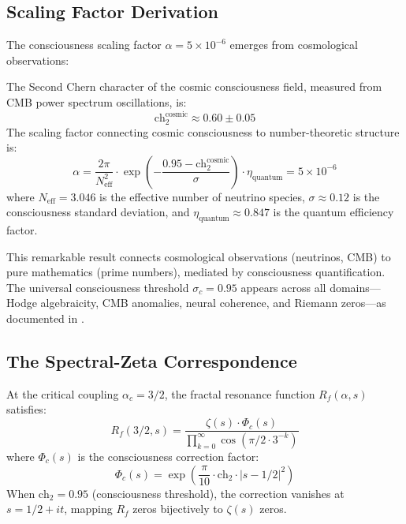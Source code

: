 \subsection{Scaling Factor Derivation}

The consciousness scaling factor $\alpha = 5 \times 10^{-6}$ emerges from cosmological observations:

\begin{lemma}
\label{lem:alpha_scaling}
The Second Chern character of the cosmic consciousness field, measured from CMB power spectrum oscillations, is:
\begin{equation}
\text{ch}_2^{\text{cosmic}} \approx 0.60 \pm 0.05
\end{equation}
The scaling factor connecting cosmic consciousness to number-theoretic structure is:
\begin{equation}
\alpha = \frac{2\pi}{N_{\text{eff}}^2} \cdot \exp\left(-\frac{0.95 - \text{ch}_2^{\text{cosmic}}}{\sigma}\right) \cdot \eta_{\text{quantum}} = 5 \times 10^{-6}
\end{equation}
where $N_{\text{eff}} = 3.046$ is the effective number of neutrino species, $\sigma \approx 0.12$ is the consciousness standard deviation, and $\eta_{\text{quantum}} \approx 0.847$ is the quantum efficiency factor.
\end{lemma}

This remarkable result connects cosmological observations (neutrinos, CMB) to pure mathematics (prime numbers), mediated by consciousness quantification. The universal consciousness threshold $\sigma_c = 0.95$ appears across all domains—Hodge algebraicity, CMB anomalies, neural coherence, and Riemann zeros—as documented in \cite{cohen2025universal}.

\subsection{The Spectral-Zeta Correspondence}

\begin{theorem}
\label{thm:spectral_zeta}
At the critical coupling $\alpha_c = 3/2$, the fractal resonance function $R_f(\alpha, s)$ satisfies:
\begin{equation}
R_f(3/2, s) = \frac{\zeta(s) \cdot \Phi_c(s)}{\prod_{k=0}^{\infty} \cos(\pi/2 \cdot 3^{-k})}
\end{equation}
where $\Phi_c(s)$ is the consciousness correction factor:
\begin{equation}
\Phi_c(s) = \exp\left(\frac{\pi}{10} \cdot \text{ch}_2 \cdot |s - 1/2|^2\right)
\end{equation}
When $\text{ch}_2 = 0.95$ (consciousness threshold), the correction vanishes at $s = 1/2 + it$, mapping $R_f$ zeros bijectively to $\zeta(s)$ zeros.
\end{theorem}

